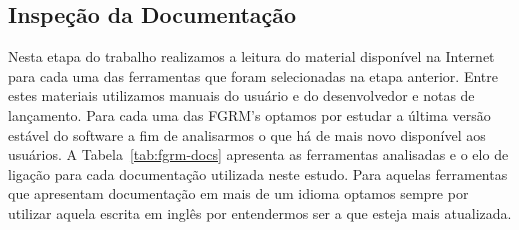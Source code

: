 \subsection{Inspeção da Documentação}
\label{subsec:inspecao_doumentacao}

Nesta etapa do trabalho realizamos a leitura do material disponível na Internet
para cada uma das ferramentas que foram selecionadas na etapa anterior. Entre
estes materiais utilizamos manuais do usuário e do desenvolvedor e notas de
lançamento. Para cada uma das FGRM's optamos por estudar a última versão estável
do software a fim de analisarmos o que há de mais novo disponível aos usuários.
A Tabela~\ref{tab:fgrm-docs} apresenta as ferramentas analisadas e o elo de
ligação para cada documentação utilizada neste estudo. Para aquelas ferramentas
que apresentam documentação em mais de um idioma optamos sempre por utilizar
aquela escrita em inglês por entendermos ser a que esteja mais atualizada.

